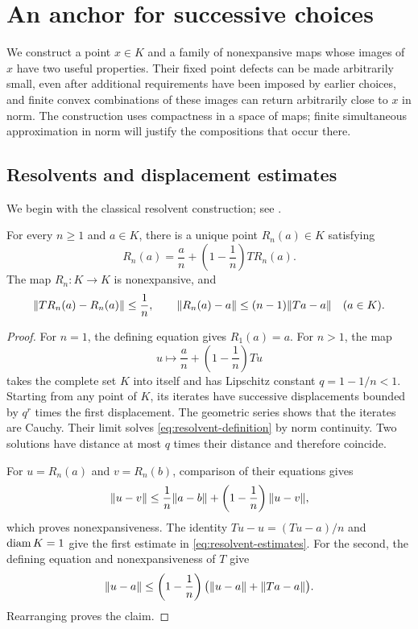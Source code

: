 \section{An anchor for successive choices}
\label{sec:anchor}

We construct a point $x\in K$ and a family of nonexpansive maps whose
images of $x$ have two useful properties.  Their fixed point defects can
be made arbitrarily small, even after additional requirements have been
imposed by earlier choices, and finite convex combinations of these
images can return arbitrarily close to $x$ in norm.  The construction
uses compactness in a space of maps; finite simultaneous approximation
in norm will justify the compositions that occur there.

\subsection{Resolvents and displacement estimates}

We begin with the classical resolvent construction; see
\citet[pp.~75--76]{Goebel1975}.

\begin{lemma}[Resolvents]
\label{lem:resolvents}
For every $n\geq 1$ and $a\in K$, there is a unique point $R_n(a)\in K$
satisfying
\begin{equation}
\label{eq:resolvent-definition}
 R_n(a)=\frac{a}{n}+\left(1-\frac1n\right)T R_n(a).
\end{equation}
The map $R_n:K\to K$ is nonexpansive, and
\begin{equation}
\label{eq:resolvent-estimates}
 \lVert T R_n(a)-R_n(a)\rVert\leq\frac1n,
 \qquad
 \lVert R_n(a)-a\rVert\leq(n-1)\lVert Ta-a\rVert
 \quad(a\in K).
\end{equation}
\end{lemma}

\begin{proof}
For $n=1$, the defining equation gives $R_1(a)=a$.  For $n>1$, the map
\[
 u\longmapsto \frac{a}{n}+\left(1-\frac1n\right)Tu
\]
takes the complete set $K$ into itself and has Lipschitz constant
$q=1-1/n<1$.  Starting from any point of $K$, its iterates have successive
displacements bounded by $q^r$ times the first displacement.  The
geometric series shows that the iterates are Cauchy.  Their limit solves
\eqref{eq:resolvent-definition} by norm continuity.  Two solutions have
distance at most $q$ times their distance and therefore coincide.

For $u=R_n(a)$ and $v=R_n(b)$, comparison of their equations gives
\[
 \lVert u-v\rVert\leq\frac1n\lVert a-b\rVert
              +\left(1-\frac1n\right)\lVert u-v\rVert,
\]
which proves nonexpansiveness.  The identity
$Tu-u=(Tu-a)/n$ and $\operatorname{diam} K=1$ give the first estimate in
\eqref{eq:resolvent-estimates}.  For the second, the defining equation
and nonexpansiveness of $T$ give
\[
 \lVert u-a\rVert
 \leq\left(1-\frac1n\right)
       \bigl(\lVert u-a\rVert+\lVert Ta-a\rVert\bigr).
\]
Rearranging proves the claim.
\end{proof}

